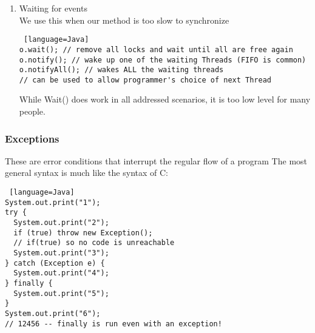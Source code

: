 \documentclass[../../lecture_notes.tex]{subfiles}
\begin{document}
\begin{enumerate} [itemsep=0mm]
		Effectively places a lock on the object → methods must be VERY fast.\\
		This fixes many errors that volatile doesn’t.
		\begin{lstlisting} [language=Java]		
class C
{
  volatile int x, y;
  synchronized void set(int newx)
  {
    if (newx < newx + 1)
    {
      x = newx; y = newx + 1;
    }
  }
  int getx() {return x;}
  int gety() {return y;}
  synchronized long getBoth () {return ((long) x << 32) + y;}
}
long ab = getBoth();
long a = ab >> 32;
long b = ab & 0xFFFFFFFF;
if (a >= b) disaster_strikes();
	\end{lstlisting}
\item Waiting for events\\
	We use this when our method is too slow to synchronize
	\begin{lstlisting} [language=Java]
o.wait(); // remove all locks and wait until all are free again
o.notify(); // wake up one of the waiting Threads (FIFO is common)
o.notifyAll(); // wakes ALL the waiting threads 
// can be used to allow programmer's choice of next Thread
		\end{lstlisting}
		While Wait() does work in all addressed scenarios, it is too low level for many people.\\
\end{enumerate}

\subsubsection*{Exceptions}
These are error conditions that interrupt the regular flow of a program
The most general syntax is much like the syntax of C:
\begin{lstlisting} [language=Java]
System.out.print("1"); 
try {
  System.out.print("2");
  if (true) throw new Exception(); 
  // if(true) so no code is unreachable
  System.out.print("3");
} catch (Exception e) {
  System.out.print("4");
} finally {
  System.out.print("5");
}
System.out.print("6");
// 12456 -- finally is run even with an exception!
 \end{lstlisting} \medskip
 
\end{document}
